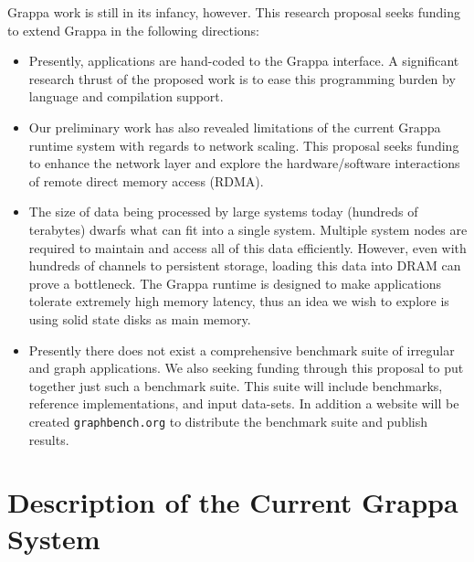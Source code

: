 Grappa work is still in its infancy, however.  This research proposal seeks funding to extend Grappa in the following directions:

\begin{itemize}
\item Presently, applications are hand-coded to the Grappa interface.  A significant research thrust of the proposed work is to ease this programming burden by language and compilation support.

\item Our preliminary work has also revealed limitations of the current Grappa runtime system with regards to network scaling.  This proposal seeks funding to enhance the network layer and explore the hardware/software interactions of remote direct memory access (RDMA).

\item The size of data being processed by large systems today (hundreds of terabytes) dwarfs what can fit into a single system. Multiple system nodes are required to maintain and access all of this data efficiently.  However, even with hundreds of channels to persistent storage, loading this data into DRAM can prove a bottleneck.  The Grappa runtime is designed to make applications tolerate extremely high memory latency, thus an idea we wish to explore is using solid state disks as main memory. 

\item Presently there does not exist a comprehensive benchmark suite of irregular and graph applications.  We also seeking funding through this proposal to put together just such a benchmark suite.  This suite will include benchmarks, reference implementations, and input data-sets.  In addition a website will be created \texttt{graphbench.org} to distribute the benchmark suite and publish results.

\end{itemize}


\section{Description of the Current Grappa System}

